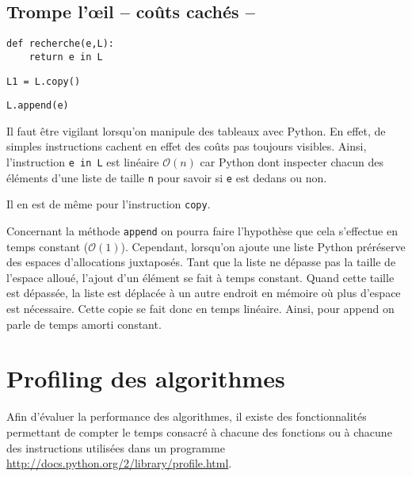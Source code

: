 \subsection{Trompe l'\oe il -- coûts cachés --}
\begin{minipage}[t]{.31\linewidth}
\begin{lstlisting}
def recherche(e,L):
    return e in L
\end{lstlisting}
\end{minipage} \hfill
\begin{minipage}[t]{.31\linewidth}
\begin{lstlisting}
L1 = L.copy()
\end{lstlisting}
\end{minipage} \hfill
\begin{minipage}[t]{.31\linewidth}
\begin{lstlisting}
L.append(e)
\end{lstlisting}
\end{minipage} 

Il faut être vigilant lorsqu'on manipule des tableaux avec Python. En effet, de simples instructions cachent en effet des coûts pas toujours visibles. 
Ainsi, l'instruction \texttt{e in L} est linéaire $\mathcal{O}(n)$ car Python dont inspecter chacun des éléments d'une liste de taille \texttt{n} pour savoir si \texttt{e} est dedans ou non.

Il en est de même pour l'instruction \texttt{copy}. 

Concernant la méthode \texttt{append} on pourra faire l'hypothèse que cela s'effectue en temps constant ($\mathcal{O}(1)$). Cependant, lorsqu'on ajoute une liste Python préréserve des espaces d'allocations juxtaposés. Tant que la liste ne dépasse pas la taille de l'espace alloué, l'ajout d'un élément se fait à temps constant. Quand cette taille est dépassée, la liste est déplacée à un autre endroit en mémoire où plus d'espace est nécessaire. Cette copie se fait donc en temps linéaire. Ainsi, pour append on parle de temps amorti constant.

\section{Profiling des algorithmes}

Afin d'évaluer la performance des algorithmes, il existe des fonctionnalités permettant de compter le temps consacré à chacune des fonctions ou à chacune des instructions utilisées dans un programme \url{http://docs.python.org/2/library/profile.html}.

